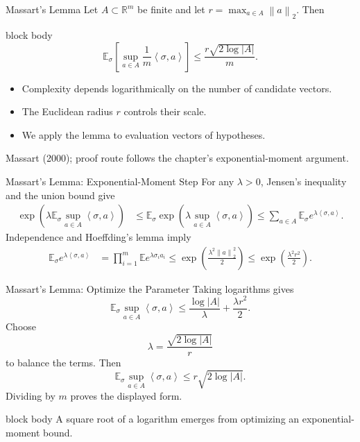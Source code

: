 \documentclass[aspectratio=169,10pt]{beamer}
\newcommand{\E}{\mathbb{E}}
\newcommand{\norm}[1]{\left\lVert #1\right\rVert}
\newcommand{\abs}[1]{\left\lvert #1\right\rvert}
\newcommand{\angles}[1]{\left\langle #1\right\rangle}
\newcommand{\SourceNote}[1]{%
  \vfill
  \begin{flushright}
    {\scriptsize\color{midgray}#1}
  \end{flushright}
}
\newcommand{\KeyBox}[1]{%
  \begin{beamercolorbox}[rounded=true,sep=0.22cm,wd=\linewidth]{block body}
    #1
  \end{beamercolorbox}%
}
\begin{document}
\begin{frame}[t]{Massart's Lemma}
  \vspace{0.03cm}
  Let $A\subset\mathbb{R}^m$ be finite and let
  $r=\max_{a\in A}\norm{a}_2$. Then
  \begin{beamercolorbox}[rounded=true,sep=0.20cm,wd=\linewidth]{block body}
    \[
      \boxed{
      \E_\sigma\left[
        \sup_{a\in A}\frac1m\angles{\sigma,a}
      \right]
      \le \frac{r\sqrt{2\log\abs{A}}}{m}.}
    \]
  \end{beamercolorbox}
  \vspace{0.15cm}
  \begin{itemize}
    \setlength{\itemsep}{0.10cm}
    \item Complexity depends logarithmically on the number of candidate vectors.
    \item The Euclidean radius $r$ controls their scale.
    \item We apply the lemma to evaluation vectors of hypotheses.
  \end{itemize}
  \SourceNote{Massart (2000); proof route follows the chapter's exponential-moment argument.}
\end{frame}

\begin{frame}[t]{Massart's Lemma: Exponential-Moment Step}
  \vspace{0.01cm}
  {\small
  For any $\lambda>0$, Jensen's inequality and the union bound give
  \begin{align*}
    \exp\!\left(\lambda\E_\sigma\sup_{a\in A}\angles{\sigma,a}\right)
    &\le \E_\sigma\exp\!\left(\lambda\sup_{a\in A}\angles{\sigma,a}\right)\le \sum_{a\in A}\E_\sigma e^{\lambda\angles{\sigma,a}}.
  \end{align*}
  Independence and Hoeffding's lemma imply
  \begin{align*}
    \E_\sigma e^{\lambda\angles{\sigma,a}}
    &=\prod_{i=1}^m\E e^{\lambda\sigma_i a_i}
    \le \exp\!\left(\frac{\lambda^2\norm{a}_2^2}{2}\right)\le \exp\!\left(\frac{\lambda^2r^2}{2}\right).
  \end{align*}}
\end{frame}

\begin{frame}[t]{Massart's Lemma: Optimize the Parameter}
  \vspace{0.03cm}
  Taking logarithms gives
  \[
    \E_\sigma\sup_{a\in A}\angles{\sigma,a}
    \le \frac{\log\abs{A}}{\lambda}+\frac{\lambda r^2}{2}.
  \]
  Choose
  \[
    \lambda=\frac{\sqrt{2\log\abs{A}}}{r}
  \]
  to balance the terms. Then
  \[
    \E_\sigma\sup_{a\in A}\angles{\sigma,a}
    \le r\sqrt{2\log\abs{A}}.
  \]
  Dividing by $m$ proves the displayed form.
  \vspace{0.08cm}
  \KeyBox{A square root of a logarithm emerges from optimizing an exponential-moment bound.}
\end{frame}
\end{document}
